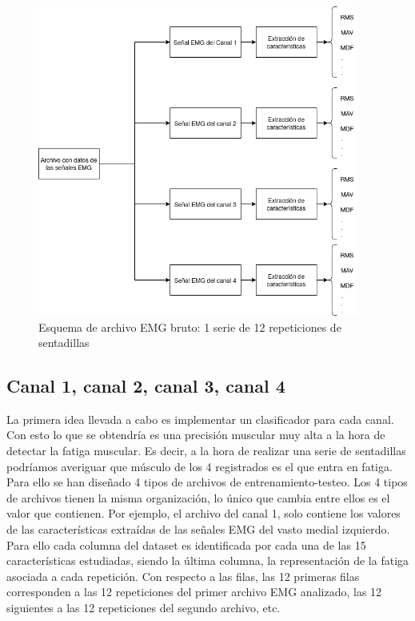    \begin{figure}[!ht]
    \centering
    \includegraphics[width=0.94\textwidth]{imagenes/esquema de los canales.png}
    \caption{ Esquema de archivo EMG bruto: 1 serie de 12 repeticiones de sentadillas }
    \label{fig:esquemaarchivoEMG}
    \end{figure}



    \subsection{Canal 1, canal 2, canal 3, canal 4}
La primera idea llevada a cabo es implementar un clasificador para cada canal. Con esto lo que se obtendría es una precisión muscular muy alta a la hora de detectar la fatiga muscular. Es decir, a la hora de realizar una serie de sentadillas podríamos averiguar que músculo de los 4 registrados es el que entra en fatiga. Para ello se han diseñado 4 tipos de archivos de entrenamiento-testeo. Los 4 tipos de archivos tienen la misma organización, lo único que cambia entre ellos es el valor que contienen. Por ejemplo, el archivo del canal 1, solo contiene los valores de las características extraídas de las señales EMG del vasto medial izquierdo. Para ello cada columna del dataset es identificada por cada una de las 15 características estudiadas, siendo la última columna, la representación de la fatiga asociada a cada repetición. Con respecto a las filas, las 12 primeras filas corresponden a las 12 repeticiones del primer archivo EMG analizado, las 12 siguientes a las 12 repeticiones del segundo archivo, etc. 

